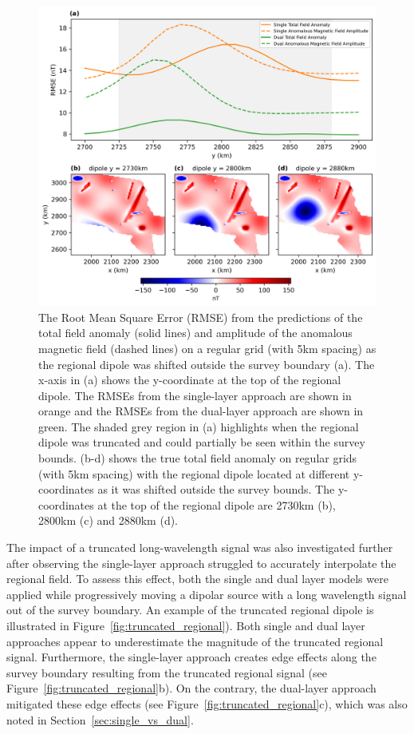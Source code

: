 \begin{figure}[tb!]
\centering
\includegraphics[width=1\linewidth]{figures/truncated_regional_rmses.png}
\caption{
    The Root Mean Square Error (RMSE) from the predictions of the total field anomaly (solid lines) and amplitude of the anomalous magnetic field (dashed lines) on a regular grid (with 5km spacing) as the regional dipole was shifted outside the survey boundary (a). The x-axis in (a) shows the y-coordinate at the top of the regional dipole. The RMSEs from the single-layer approach are shown in orange and the RMSEs from the dual-layer approach are shown in green. The shaded grey region in (a) highlights when the regional dipole was truncated and could partially be seen within the survey bounds. (b-d) shows the true total field anomaly on regular grids (with 5km spacing) with the regional dipole located at different y-coordinates as it was shifted outside the survey bounds. The y-coordinates at the top of the regional dipole are 2730km (b), 2800km (c) and 2880km (d).
}
\label{fig:truncated_regional_rmses}
\end{figure}

The impact of a truncated long-wavelength signal was also investigated further after observing the single-layer approach struggled to accurately interpolate the regional field. To assess this effect, both the single and dual layer models were applied while progressively moving a dipolar source with a long wavelength signal out of the survey boundary. An example of the truncated regional dipole is illustrated in Figure~\ref{fig:truncated_regional}). Both single and dual layer approaches appear to underestimate the magnitude of the truncated regional signal. Furthermore, the single-layer approach creates edge effects along the survey boundary resulting from the truncated regional signal (see Figure~\ref{fig:truncated_regional}b). On the contrary, the dual-layer approach mitigated these edge effects (see Figure~\ref{fig:truncated_regional}c), which was also noted in Section~\ref{sec:single_vs_dual}.

